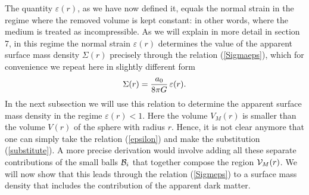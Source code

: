\documentclass[a4paper,12pt]{article}
\begin{document}
The quantity $\varepsilon(r)$, as we have now defined it, equals the normal strain in the regime where the removed volume is kept constant: in other words, where the medium is treated as incompressible. As we will explain in more detail  in section 7,  in this regime the normal strain $\varepsilon(r)$ %
    determines the value of the apparent surface mass density $\Sigma(r)$ precisely through the relation (\ref{Sigmaeps}), which for convenience we repeat here in slightly different form
\begin{equation}
\label{Sigmeps}
\Sigma(r) =  {a_0\over 8\pi G}\,\varepsilon(r) .
\end{equation}
In the next subsection we will use this relation to determine the apparent surface mass density in the regime $\varepsilon(r) <1$.  Here the volume $V_M(r)$ is smaller than the volume $V(r)$ of the sphere with radius $r$. Hence, it is not clear anymore that one can simply take the relation (\ref{epsilon}) and make the substitution (\ref{substitute}).  A more precise derivation would involve adding all these separate contributions of the small balls ${\cal B}_i$ that together compose the region ${\cal V}_M(r)$.  We will now show that this leads through the relation (\ref{Sigmeps}) to a surface mass density that includes the contribution of the apparent dark matter.  





 
\end{document}
